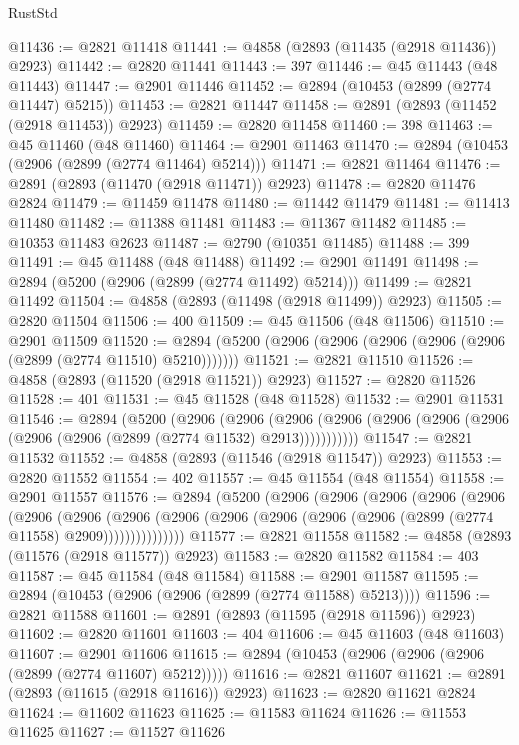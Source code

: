 \begin{lexlean}{RustStd}
\begin{coremodule}
@11436 := @2821 @11418
@11441 := @4858 (@2893 (@11435 (@2918 @11436)) @2923)
@11442 := @2820 @11441
@11443 := 397
@11446 := @45 @11443 (@48 @11443)
@11447 := @2901 @11446
@11452 := @2894 (@10453 (@2899 (@2774 @11447) @5215))
@11453 := @2821 @11447
@11458 := @2891 (@2893 (@11452 (@2918 @11453)) @2923)
@11459 := @2820 @11458
@11460 := 398
@11463 := @45 @11460 (@48 @11460)
@11464 := @2901 @11463
@11470 := @2894 (@10453 (@2906 (@2899 (@2774 @11464) @5214)))
@11471 := @2821 @11464
@11476 := @2891 (@2893 (@11470 (@2918 @11471)) @2923)
@11478 := @2820 @11476 @2824
@11479 := @11459 @11478
@11480 := @11442 @11479
@11481 := @11413 @11480
@11482 := @11388 @11481
@11483 := @11367 @11482
@11485 := @10353 @11483 @2623
@11487 := @2790 (@10351 @11485)
@11488 := 399
@11491 := @45 @11488 (@48 @11488)
@11492 := @2901 @11491
@11498 := @2894 (@5200 (@2906 (@2899 (@2774 @11492) @5214)))
@11499 := @2821 @11492
@11504 := @4858 (@2893 (@11498 (@2918 @11499)) @2923)
@11505 := @2820 @11504
@11506 := 400
@11509 := @45 @11506 (@48 @11506)
@11510 := @2901 @11509
@11520 := @2894 (@5200 (@2906 (@2906 (@2906 (@2906 (@2906 (@2899 (@2774 @11510) @5210)))))))
@11521 := @2821 @11510
@11526 := @4858 (@2893 (@11520 (@2918 @11521)) @2923)
@11527 := @2820 @11526
@11528 := 401
@11531 := @45 @11528 (@48 @11528)
@11532 := @2901 @11531
@11546 := @2894
    (@5200
      (@2906
        (@2906
          (@2906 (@2906 (@2906 (@2906 (@2906 (@2906 (@2906 (@2899 (@2774 @11532) @2913)))))))))))
@11547 := @2821 @11532
@11552 := @4858 (@2893 (@11546 (@2918 @11547)) @2923)
@11553 := @2820 @11552
@11554 := 402
@11557 := @45 @11554 (@48 @11554)
@11558 := @2901 @11557
@11576 := @2894
    (@5200
      (@2906
        (@2906
          (@2906
            (@2906
              (@2906
                (@2906
                  (@2906
                    (@2906
                      (@2906 (@2906 (@2906 (@2906 (@2906 (@2899 (@2774 @11558) @2909)))))))))))))))
@11577 := @2821 @11558
@11582 := @4858 (@2893 (@11576 (@2918 @11577)) @2923)
@11583 := @2820 @11582
@11584 := 403
@11587 := @45 @11584 (@48 @11584)
@11588 := @2901 @11587
@11595 := @2894 (@10453 (@2906 (@2906 (@2899 (@2774 @11588) @5213))))
@11596 := @2821 @11588
@11601 := @2891 (@2893 (@11595 (@2918 @11596)) @2923)
@11602 := @2820 @11601
@11603 := 404
@11606 := @45 @11603 (@48 @11603)
@11607 := @2901 @11606
@11615 := @2894 (@10453 (@2906 (@2906 (@2906 (@2899 (@2774 @11607) @5212)))))
@11616 := @2821 @11607
@11621 := @2891 (@2893 (@11615 (@2918 @11616)) @2923)
@11623 := @2820 @11621 @2824
@11624 := @11602 @11623
@11625 := @11583 @11624
@11626 := @11553 @11625
@11627 := @11527 @11626

\end{coremodule}
\end{lexlean}
